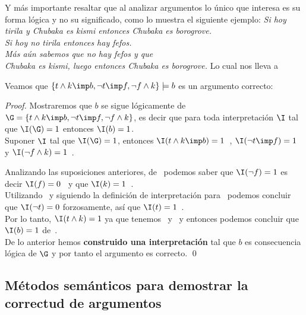 \documentclass[11pt,letterpaper]{article}
\begin{document}
\newpage

Y m\'as importante resaltar que al analizar argumentos lo \'unico que interesa 
es su forma l\'ogica y no su significado, como lo muestra el siguiente ejemplo:
\bc
\emph{Si hoy tirila y Chubaka es kismi entonces Chubaka es borogrove.\\
  Si hoy no tirila entonces hay fefos.\\ M\'as a\'un sabemos que no hay fefos y 
  que\\ Chubaka es kismi, luego entonces Chubaka es borogrove.
}
\ec
Lo cual nos lleva a
\begin{mathpar}
\end{mathpar}
Veamos que $\{t\land k\imp b, \lnot t\imp f,\lnot f\land k\}\models b$
es un argumento correcto: 

\begin{proof}
\locallabelreset

Mostraremos que $b$ se sigue l\'ogicamente de $\G=\{t\land k\imp b, \lnot 
t\imp f,\lnot f\land k\}$, es decir que para toda interpretaci\'on $\I$ tal que 
$\I(\G)=1$ entonces $\I(b)=1$. \\

Suponer $\I$ tal que $\I(\G)=1$, entonces $\I(t\land k\imp b)=1$~, 
$\I(\lnot t\imp f)=1$~ y $\I(\lnot f\land k)=1$~. 

\noindent Analizando las suposiciones anteriores, de~ podemos saber 
que $\I(\lnot f) =1$ es decir $\I(f)=0$~ y que 
$\I(k)=1$~.\\
Utilizando~ y siguiendo la definici\'on de interpretaci\'on 
para~ podemos concluir que $\I(\lnot t) = 0$ forzosamente, as\'i que 
$\I(t)=1$~. \\
Por lo tanto, $\I(t\land k) =1$ ya que tenemos~ y~ y entonces 
podemos concluir que $\I(b)=1$ de~.\\
De lo anterior hemos \textbf{construido una interpretaci\'on} tal que $b$ es 
consecuencia l\'ogica de $\G$ y por tanto el argumento es correcto. 
\qed
\end{proof}


\subsection{M\'etodos sem\'anticos para demostrar la correctud de argumentos}
\end{document}
